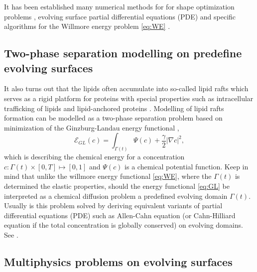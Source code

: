 It has been established many numerical methods for for shape optimization problems \cite{sokolowski1992introduction,ito2008variational}, evolving surface partial differential equations (PDE) \cite{dziuk2013finite, dziuk2007finite,
binz2022convergent, barrett2007parametric, barrett2007variational, kovacs2019convergent, lehrenfeld2018stabilized} and specific
algorithms for the Willmore energy problem \eqref{eq:WE} \cite{palmurella2022parametric, dziuk2008computational, bonito2010parametric,  kovacs2021convergent, hu2022evolving}.

\subsection{Two-phase separation modelling on predefine evolving surfaces }%
\label{sub:two_phase_seperation_modelling_on_surfaces_}

It also turns out that the lipids often accumulate into so-called lipid rafts which serves as a rigid platform for proteins with special properties such as intracellular trafficking of lipids and lipid-anchored proteins \cite{Edidin03, miller2020divide}. Modelling of
lipid rafts formation can be modelled as a two-phase separation problem based on minimization of the Ginzburg-Landau energy functional \cite{yushutin19},
\begin{equation}
\label{eq:GL}
\mathcal{E}_{GL}  \left( c   \right) = \int_{\Gamma\left(t  \right)   }^{}\Psi \left( c \right) + \frac{\gamma}{2} \left\lvert \nabla c \right\rvert^{2} ,
\end{equation}
which is describing the chemical energy for a concentration $c: \Gamma\left( t \right)  \times \left[ 0,T \right] \mapsto  \left[ 0,1 \right]  $ and $ \Psi \left( c \right)$ is a chemical potential function. Keep in mind that unlike
the willmore energy functional \eqref{eq:WE}, where the $\Gamma\left( t \right)  $ is determined the elastic properties, should the energy functional \eqref{eq:GL} be interpreted as a chemical diffusion problem a predefined evolving domain $\Gamma \left( t \right) $.
Usually is this problem solved by deriving equivalent variants of partial differential equations (PDE) such as Allen-Cahn equation (or Cahn-Hilliard equation if the total concentration is globally conserved) on evolving domains. See \cite{yushutin19, udo97, ratz16,Gera2017, caetano21}.

\subsection{Multiphysics problems on evolving surfaces}%

